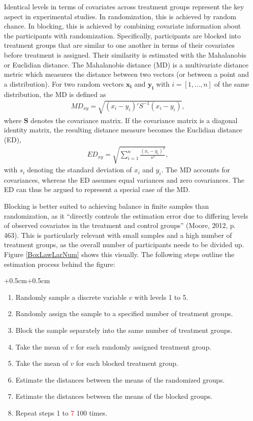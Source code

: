 \documentclass[12pt,econ]{sources/authesis}
\begin{document}
Identical levels in terms of covariates across treatment groups represent the key aspect in experimental studies. In randomization, this is achieved by random chance. In blocking, this is achieved by combining covariate information about the participants with randomization. Specifically, participants are blocked into treatment groups that are similar to one another in terms of their covariates before treatment is assigned. Their similarity is estimated with the Mahalanobis or Euclidian distance. The Mahalanobis distance (MD) is a multivariate distance metric which measures the distance between two vectors (or between a point and a distribution). For two random vectors \(\bm{x_i}\) and \(\bm{y_i}\) with \(i = [1,\ldots,n]\) of the same distribution, the MD is defined as
\begin{align}
MD_{xy} = \sqrt{(x_i - y_i)' S^{-1} (x_i - y_i)},
\end{align}
where \(\bm{S}\) denotes the covariance matrix. If the covariance matrix is a diagonal identity matrix, the resulting distance measure becomes the Euclidian distance (ED),
\begin{align}
ED_{xy} = \sqrt{\sum_{i=1}^n \frac{(x_i - y_i)^2}{s^2}},
\end{align}
with \(s_i\) denoting the standard deviation of \(x_i\) and \(y_i\). The MD accounts for covariances, whereas the ED assumes equal variances and zero covariances. The ED can thus be argued to represent a special case of the MD.

Blocking is better suited to achieving balance in finite samples than randomization, as it ``directly controls the estimation error due to differing levels of observed covariates in the treatment and control groups'' (Moore, 2012, p. 463). This is particularly relevant with small samples and a high number of treatment groups, as the overall number of participants needs to be divided up. Figure \ref{BoxLawLarNum} shows this visually. The following steps outline the estimation process behind the figure:

\vspace{0.3cm}
\begin{adjustwidth*}{+0.5cm}{+0.5cm}
\begin{enumerate}
\item \noindent Randomly sample a discrete variable $v$ with levels 1 to 5.
\item Randomly assign the sample to a specified number of treatment groups. 
\item Block the sample separately into the same number of treatment groups. 
\item Take the mean of $v$ for each randomly assigned treatment group. 
\item Take the mean of $v$ for each blocked treatment group. 
\item Estimate the distances between the means of the randomized groups.
\item Estimate the distances between the means of the blocked groups.
\item Repeat steps 1 to \textcolor{red}{7} 100 times.
\end{enumerate}
\end{adjustwidth*}
\vspace{0.3cm}
\end{document}
